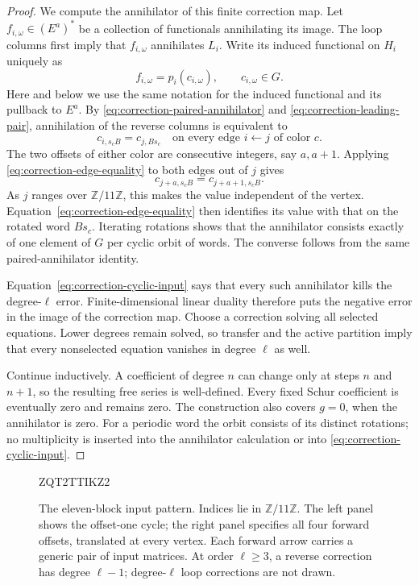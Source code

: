 \documentclass[11pt]{article}
\theoremstyle{definition}
\theoremstyle{remark}
\numberwithin{equation}{section}
\begin{document}
\begin{proof}
We compute the annihilator of this finite correction map.  Let
$f_{i,\omega}\in(E^a)^*$ be a collection of functionals annihilating its
image.  The loop columns first imply that $f_{i,\omega}$ annihilates
$L_i$.  Write its induced functional on $H_i$ uniquely as
\[
 f_{i,\omega}=p_i(c_{i,\omega}),\qquad c_{i,\omega}\in G.
\]
Here and below we use the same notation for the induced functional and
its pullback to $E^a$.  By
\eqref{eq:correction-paired-annihilator} and
\eqref{eq:correction-leading-pair}, annihilation of the reverse columns
is equivalent to
\begin{equation}
 c_{i,s_cB}=c_{j,Bs_c}
 \quad\text{on every edge }i\leftarrow j\text{ of color }c.
 \label{eq:correction-edge-equality}
\end{equation}
The two offsets of either color are consecutive integers, say $a,a+1$.
Applying \eqref{eq:correction-edge-equality} to both edges out of $j$
gives
\[
 c_{j+a,s_cB}=c_{j+a+1,s_cB}.
\]
As $j$ ranges over $\mathbb Z/11\mathbb Z$, this makes the value
independent of the vertex.  Equation~\eqref{eq:correction-edge-equality}
then identifies its value with that on the rotated word $Bs_c$.
Iterating rotations shows that the annihilator consists exactly of one
element of $G$ per cyclic orbit of words.  The converse follows from
the same paired-annihilator identity.

Equation~\eqref{eq:correction-cyclic-input} says that every such
annihilator kills the degree-$\ell$ error.  Finite-dimensional linear
duality therefore puts the negative error in the image of the correction
map.  Choose a correction solving all selected equations.  Lower degrees
remain solved, so transfer and the active partition imply that every
nonselected equation vanishes in degree $\ell$ as well.

Continue inductively.  A coefficient of degree $n$ can change only at
steps $n$ and $n+1$, so the resulting free series is well-defined.
Every fixed Schur coefficient is eventually zero and remains zero.
The construction also covers $g=0$, when the annihilator is zero.
For a periodic word the orbit consists of its distinct rotations; no
multiplicity is inserted into the annihilator calculation or into
\eqref{eq:correction-cyclic-input}.
\end{proof}

\begin{figure}[tbp]

ZQT2TTIKZ2

\caption{The eleven-block input pattern. Indices lie in $\mathbb Z/11\mathbb Z$.
The left panel shows the offset-one cycle; the right panel specifies all
four forward offsets, translated at every vertex. Each forward arrow carries a
generic pair of input matrices. At order $\ell\ge3$, a reverse correction
has degree $\ell-1$; degree-$\ell$ loop corrections are not drawn.}
\label{fig:eleven-blocks}
\end{figure}
\end{document}
